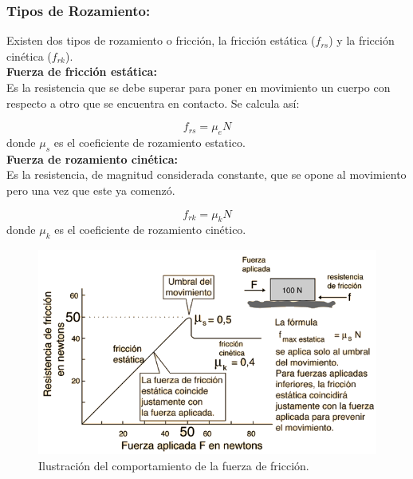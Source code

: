\subsubsection{Tipos de Rozamiento:}

Existen dos tipos de rozamiento o fricción, la fricción estática ($f_{rs}$) y la fricción cinética ($f_{rk}$).\\ 
 
\textbf{Fuerza de fricción estática:}\\

Es la resistencia que se debe superar para poner en movimiento un cuerpo con respecto a otro que se encuentra en 
contacto. Se calcula así:

\begin{equation}
f_{rs} = \mu_e N
\end{equation}
donde $\mu_s$ es el coeficiente de rozamiento estatico.\\

\textbf{Fuerza de rozamiento cinética:}\\

Es la resistencia, de magnitud considerada constante, que se opone al movimiento pero una vez que este ya comenzó.

\begin{equation}
f_{rk} = \mu_k N
\end{equation}
donde $\mu_k$ es el coeficiente de rozamiento cinético.

\begin{figure}[ht]
 \centering
 \includegraphics[scale=0.4]{images/fsta.png}
 \caption{Ilustración del comportamiento de la fuerza de fricción.}\label{frb}
\end{figure}

